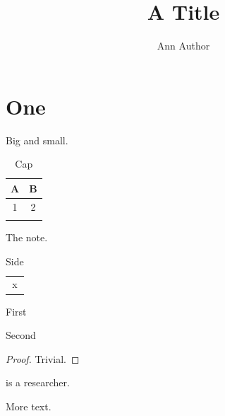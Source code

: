 \documentclass{sn-jnl}
\begin{document}
\title{A Title}
\author*[1]{ }
\author[1]{ }\nomail
{}

\maketitle
\section{One}
{\Titlefont Big} and {\tablebodyfont small}.
\begin{table}[h]
\caption{Cap}
\begin{tabular}{cc}\toprule A & B\tnote{a}\\\midrule 1 & 2\\\botrule\end{tabular}
\begin{tablenotes}\item[a] The note.\end{tablenotes}
\end{table}
\begin{table}\sidewaystablefn
\caption{Side}
\begin{tabular}{c}x\\\end{tabular}
\end{table}
\begin{unenumerate}\item First\item Second\end{unenumerate}
\begin{proof}Trivial.\end{proof}
\begin{biography}{}{\author{Ann Author} is a researcher.}More text.\end{biography}
\end{document}
